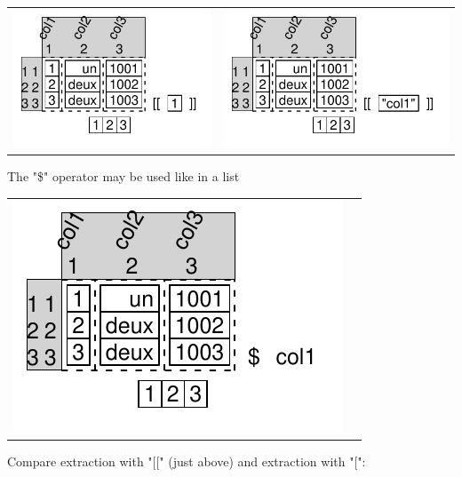\documentclass[pdflatex]{article}
\begin{document}
\begin{tabular}{cc}
\includegraphics{dataframe_list_like_extraction_3.pdf} & \includegraphics{dataframe_list_like_extraction_2.pdf}
\end{tabular}

The "\$" operator may be used like in a list

\begin{tabular}{cc}
\includegraphics{dataframe_list_like_extraction_1.pdf}
\end{tabular}

Compare extraction with "[[" (just above) and extraction with "[":
\end{document}
